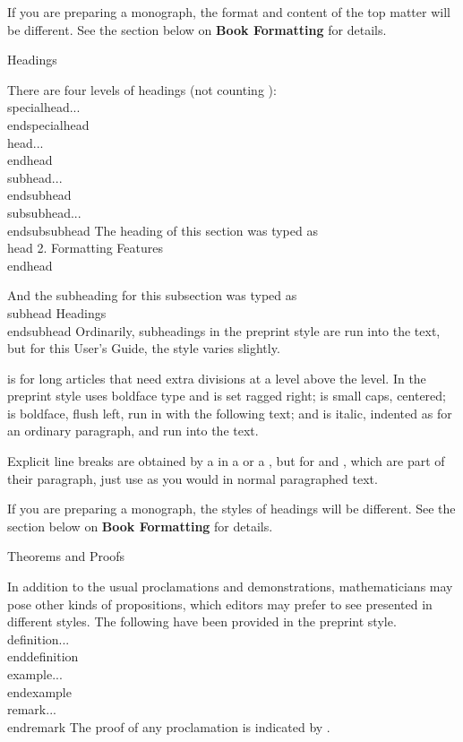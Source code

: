 If you are preparing a monograph, the format and content of the top matter
will be different.  See the section below on {\bf Book Formatting} for
details.


\subhead Headings \endsubhead

There are four levels of headings (not counting
):
\beginexample{}
\\specialhead...\\endspecialhead
\\head...\\endhead
\\subhead...\\endsubhead
\\subsubhead...\\endsubsubhead
\endexample
\noindent The heading of
this section was typed as
\beginexample{}
\\head 2. Formatting Features
\\endhead
\endexample

\noindent And the subheading for this subsection was typed as
\beginexample{}
\\subhead Headings\\endsubhead
\endexample
\noindent
Ordinarily, subheadings in the preprint style are run into the text, but for
this User's Guide, the style varies slightly.

\indent{} is for long articles that need extra divisions at
a level above the  level. In the preprint style
 uses boldface type and is set ragged right; 
is small caps, centered;  is boldface, flush left,
run in with the following text; and
 is italic, indented as for an ordinary paragraph, and run
into the text.

Explicit line breaks are obtained by a \cs{\\} in a  or a
, but for  and ,
which are part of their paragraph, just use  as
you would in normal paragraphed text.

If you are preparing a monograph, the styles of headings will be different.
See the section below on {\bf Book Formatting} for details.


\subhead Theorems and Proofs \endsubhead

In addition to the usual proclamations and demonstrations, mathematicians
may pose other kinds of propositions, which editors may prefer to see
presented in different styles.  The following have been provided in
the preprint style.
\beginexample{}
\\definition...\\enddefinition
\\example...\\endexample
\\remark...\\endremark
\endexample
\noindent
The proof of any proclamation is indicated by .

